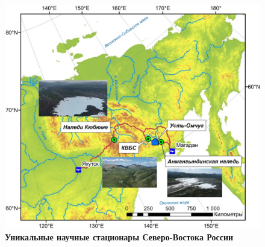 \begin{figure}[h!]
\begin{changemargin}{-1.25cm}{0cm}
  \begin{center}
    \includegraphics[width=1.2\textwidth]{authors/zemlaykova-2-fig.jpg}
  \end{center}
\end{changemargin}
  \caption*{\textbf{Уникальные научные стационары Северо-Востока России}}
  \label{fig:zemlaykova-2-fig}
\end{figure}
